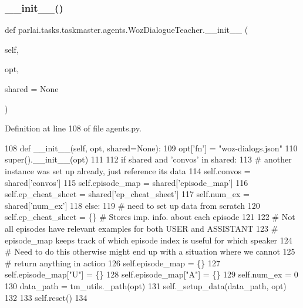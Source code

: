 \subsubsection{\texorpdfstring{\+\_\+\+\_\+init\+\_\+\+\_\+()}{\_\_init\_\_()}}
{\footnotesize\ttfamily def parlai.\+tasks.\+taskmaster.\+agents.\+Woz\+Dialogue\+Teacher.\+\_\+\+\_\+init\+\_\+\+\_\+ (\begin{DoxyParamCaption}\item[{}]{self,  }\item[{}]{opt,  }\item[{}]{shared = {\ttfamily None} }\end{DoxyParamCaption})}



Definition at line 108 of file agents.\+py.


\begin{DoxyCode}
108     \textcolor{keyword}{def }\_\_init\_\_(self, opt, shared=None):
109         opt[\textcolor{stringliteral}{'fn'}] = \textcolor{stringliteral}{"woz-dialogs.json"}
110         super().\_\_init\_\_(opt)
111 
112         \textcolor{keywordflow}{if} shared \textcolor{keywordflow}{and} \textcolor{stringliteral}{'convos'} \textcolor{keywordflow}{in} shared:
113             \textcolor{comment}{# another instance was set up already, just reference its data}
114             self.convos = shared[\textcolor{stringliteral}{'convos'}]
115             self.episode\_map = shared[\textcolor{stringliteral}{'episode\_map'}]
116             self.ep\_cheat\_sheet = shared[\textcolor{stringliteral}{'ep\_cheat\_sheet'}]
117             self.num\_ex = shared[\textcolor{stringliteral}{'num\_ex'}]
118         \textcolor{keywordflow}{else}:
119             \textcolor{comment}{# need to set up data from scratch}
120             self.ep\_cheat\_sheet = \{\}  \textcolor{comment}{# Stores imp. info. about each episode}
121 
122             \textcolor{comment}{# Not all episodes have relevant examples for both USER and ASSISTANT}
123             \textcolor{comment}{# episode\_map keeps track of which episode index is useful for which speaker}
124             \textcolor{comment}{# Need to do this otherwise might end up with a situation where we cannot}
125             \textcolor{comment}{# return anything in action}
126             self.episode\_map = \{\}
127             self.episode\_map[\textcolor{stringliteral}{"U"] = \{\}}
128 \textcolor{stringliteral}{            self.episode\_map["A"}] = \{\}
129             self.num\_ex = 0
130             data\_path = tm\_utils.\_path(opt)
131             self.\_setup\_data(data\_path, opt)
132 
133         self.reset()
134 
\end{DoxyCode}


